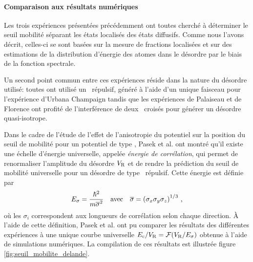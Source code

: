 \paragraph*{Comparaison aux résultats numériques}
Les trois expériences présentées précédemment \citep{kondov2011three}\citep{jendrzejewski2012three}\citep{semeghini2015measurement} ont toutes cherché à déterminer le seuil mobilité séparant les états localisés des états diffusifs. Comme nous l'avons décrit, celles-ci se sont basées sur la mesure de fractions localisées et sur des estimations de la distribution d'énergie des atomes dans le désordre par le biais de la fonction spectrale.

Un second point commun entre ces expériences réside dans la nature du désordre utilisé: toutes ont utilisé un \speckle\ répulsif, généré à l'aide d'un unique faisceau pour l'expérience d'Urbana Champaign tandis que les expériences de Palaiseau et de Florence ont profité de l'interférence de deux \speckles\ croisés pour générer un désordre quasi-isotrope. 

Dans le cadre de l'étude de l'effet de l'anisotropie du potentiel sur la position du seuil de mobilité pour un potentiel de type \speckle , Pasek et al. \citep{pasek2017anderson} ont montré qu'il existe une échelle d'énergie universelle, appelée \emph{énergie de corrélation}, qui permet de renormaliser l'amplitude du désordre $V_{\mathrm{R}}$ et de rendre la prédiction du seuil de mobilité universelle pour un désordre de type \speckle\ répulsif. Cette énergie est définie par
\begin{equation}
E_{\sigma}=\frac{\hslash^2}{m\overline{\sigma}^2} \quad \text{avec} \quad \overline{\sigma}={(\sigma_x \sigma_y \sigma_z)}^{1/3} \text{ ,}
\end{equation}
où les $\sigma_i$ correspondent aux longueurs de corrélation selon chaque direction. À l'aide de cette définition, Pasek et al. ont pu comparer les résultats des différentes expériences à une unique courbe universelle $E_{\mathrm{c}}/V_{\mathrm{R}}=\mathcal{F}(V_{\mathrm{R}}/E_{\sigma})$ obtenue à l'aide de simulations numériques. La compilation de ces résultats est illustrée figure \ref{fig:seuil_mobilite_delande}.


